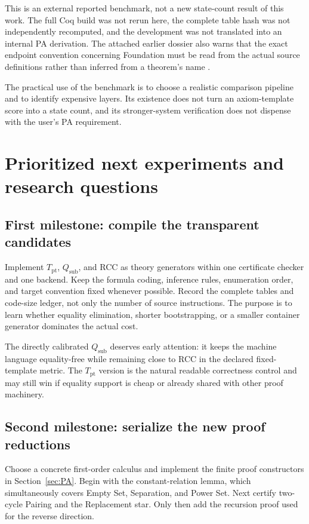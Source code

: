 \documentclass[11pt,letterpaper]{article}
\theoremstyle{definition}\newtheorem{definition}[theorem]{Definition}
\theoremstyle{remark}\newtheorem{remark}[theorem]{Remark}
\newcommand{\Tpt}{T_{\mathrm{pt}}}
\newcommand{\QTsub}{Q_{\mathrm{sub}}}
\begin{document}
This is an external reported benchmark, not a new state-count result of
this work. The full Coq build was not rerun here, the complete table
hash was not independently recomputed, and the development was not
translated into an internal PA derivation. The attached earlier dossier
also warns that the exact endpoint convention concerning Foundation
must be read from the actual source definitions rather than inferred
from a theorem's name \cite{prior3}.

The practical use of the benchmark is to choose a realistic comparison
pipeline and to identify expensive layers. Its existence does not turn
an axiom-template score into a state count, and its stronger-system
verification does not dispense with the user's PA requirement.

\section{Prioritized next experiments and research questions}
\label{sec:priorities}

\subsection{First milestone: compile the transparent candidates}

Implement $\Tpt$, $\QTsub$, and RCC as theory generators within one
certificate checker and one backend. Keep the formula coding, inference
rules, enumeration order, and target convention fixed whenever possible.
Record the complete tables and code-size ledger, not only the number of
source instructions. The purpose is to learn whether equality elimination,
shorter bootstrapping, or a smaller container generator dominates the
actual cost.

The directly calibrated $\QTsub$ deserves early attention: it keeps the
machine language equality-free while remaining close to RCC in the
declared fixed-template metric. The $\Tpt$ version is the natural
readable correctness control and may still win if equality support is
cheap or already shared with other proof machinery.

\subsection{Second milestone: serialize the new proof reductions}

Choose a concrete first-order calculus and implement the finite proof
constructors in Section~\ref{sec:PA}. Begin with the constant-relation
lemma, which simultaneously covers Empty Set, Separation, and Power
Set. Next certify two-cycle Pairing and the Replacement star. Only then
add the recursion proof used for the reverse direction.
\end{document}
